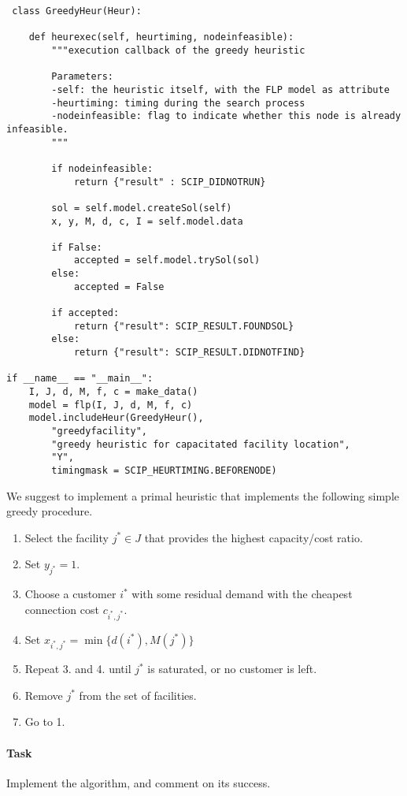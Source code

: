 \documentclass[a4paper,10pt]{article}
\begin{document}
\begin{lstlisting}
 class GreedyHeur(Heur):

    def heurexec(self, heurtiming, nodeinfeasible):
        """execution callback of the greedy heuristic

        Parameters:
        -self: the heuristic itself, with the FLP model as attribute
        -heurtiming: timing during the search process
        -nodeinfeasible: flag to indicate whether this node is already infeasible.
        """

        if nodeinfeasible:
            return {"result" : SCIP_DIDNOTRUN}

        sol = self.model.createSol(self)
        x, y, M, d, c, I = self.model.data

        if False:
            accepted = self.model.trySol(sol)
        else:
            accepted = False
            
        if accepted:
            return {"result": SCIP_RESULT.FOUNDSOL}
        else:
            return {"result": SCIP_RESULT.DIDNOTFIND}

if __name__ == "__main__":
    I, J, d, M, f, c = make_data()
    model = flp(I, J, d, M, f, c)
    model.includeHeur(GreedyHeur(), 
        "greedyfacility", 
        "greedy heuristic for capacitated facility location", 
        "Y",
        timingmask = SCIP_HEURTIMING.BEFORENODE)
\end{lstlisting}

We suggest to implement a primal heuristic that implements 
the following simple greedy procedure.

\begin{enumerate}
    \item Select the facility $j^{*} \in J$ that provides
    the highest capacity/cost ratio.
    \item Set $y_{j^{*}} = 1$.
    \item Choose a customer $i^{*}$ with some residual demand
    with the cheapest connection cost $c_{i^{*}, j^{*}}$.
    \item Set $x_{i^{*},j^{*}} = \min\{d(i^{*}), M(j^{*})\}$
    \item Repeat 3. and 4. until $j^{*}$ is saturated,
    or no customer is left.
    \item Remove $j^{*}$ from the set of facilities.
    \item Go to 1. 
\end{enumerate}

\paragraph{Task}
Implement the algorithm, and comment on its success.
\end{document}
